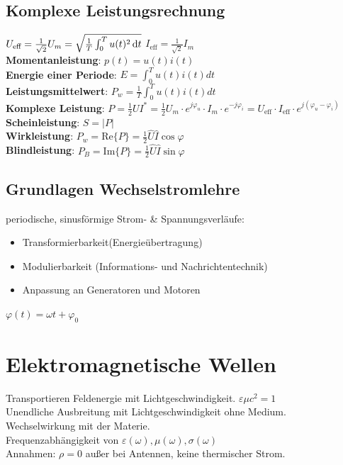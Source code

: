 \documentclass[6pt,a4paper]{scrartcl}
\begin{document}
\begin{multicols}{4}
{	\subsection{Komplexe Leistungsrechnung}
	$U_{\text{eff}} = \frac{1}{\sqrt{2}}U_m = \sqrt{\frac{1}{T}\int_0^T u(t)^2\diff t}$\qquad
	$I_{\text{eff}} = \frac{1}{\sqrt{2}}I_m$\\
	\textbf{Momentanleistung}: $p(t) = u(t)i(t)$\\
	\textbf{Energie einer Periode}: $E=\int_0^Tu(t)i(t)dt$\\
	\textbf{Leistungsmittelwert}: $P_w = \frac{1}{T} \int_0^T u(t)i(t)dt$\\
	\textbf{Komplexe Leistung}: $P = \frac{1}{2}UI^* = \frac{1}{2}U_m\cdot e^{j\varphi_u}\cdot I_m\cdot e^{-j\varphi_i} = U_{\text{eff}}\cdot I_{\text{eff}}\cdot e^{j(\varphi_u-\varphi_i)}$\\
	\textbf{Scheinleistung}: $S = |P|$\\
	\textbf{Wirkleistung}: $P_w = \text{Re}\{P\} = \frac{1}{2}\hat U\hat I\cos \varphi$\\
	\textbf{Blindleistung}: $P_B = \text{Im}\{P\} = \frac{1}{2}\hat U\hat I\sin \varphi$
}

	\subsection{Grundlagen Wechselstromlehre}
	periodische, sinusförmige Strom- \& Spannungsverläufe:\\
	\begin{itemize}
		\item Transformierbarkeit(Energieübertragung) 
		\item Modulierbarkeit (Informations- und Nachrichtentechnik)
		\item Anpassung an Generatoren und Motoren
	\end{itemize}
	$\varphi(t) = \omega t + \varphi_0$ 

\section{Elektromagnetische Wellen}
Transportieren Feldenergie mit Lichtgeschwindigkeit. $\varepsilon \mu c^2 = 1$\\ 
Unendliche Ausbreitung mit Lichtgeschwindigkeit ohne Medium.\\
Wechselwirkung mit der Materie.\\
Frequenzabhängigkeit von $\varepsilon(\omega),\mu(\omega),\sigma(\omega)$\\
Annahmen: $\rho = 0$ außer bei Antennen, keine thermischer Strom.\\


\end{multicols}
\end{document}
